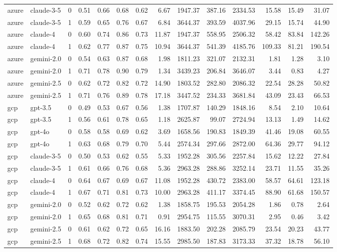 \begin{tabular}{llrrrrrrrrrrrr}
azure & claude-3-5 & 0 & 0.51 & 0.66 & 0.68 & 0.62 & 6.67 & 1947.37 & 387.16 & 2334.53 & 15.58 & 15.49 & 31.07 \\
azure & claude-3-5 & 1 & 0.59 & 0.65 & 0.76 & 0.67 & 6.84 & 3644.37 & 393.59 & 4037.96 & 29.15 & 15.74 & 44.90 \\
azure & claude-4 & 0 & 0.60 & 0.74 & 0.86 & 0.73 & 11.87 & 1947.37 & 558.95 & 2506.32 & 58.42 & 83.84 & 142.26 \\
azure & claude-4 & 1 & 0.62 & 0.77 & 0.87 & 0.75 & 10.94 & 3644.37 & 541.39 & 4185.76 & 109.33 & 81.21 & 190.54 \\
azure & gemini-2.0 & 0 & 0.54 & 0.63 & 0.87 & 0.68 & 1.98 & 1811.23 & 321.07 & 2132.31 & 1.81 & 1.28 & 3.10 \\
azure & gemini-2.0 & 1 & 0.71 & 0.78 & 0.90 & 0.79 & 1.34 & 3439.23 & 206.84 & 3646.07 & 3.44 & 0.83 & 4.27 \\
azure & gemini-2.5 & 0 & 0.62 & 0.72 & 0.82 & 0.72 & 14.90 & 1803.52 & 282.80 & 2086.32 & 22.54 & 28.28 & 50.82 \\
azure & gemini-2.5 & 1 & 0.71 & 0.76 & 0.89 & 0.78 & 17.18 & 3447.52 & 234.33 & 3681.84 & 43.09 & 23.43 & 66.53 \\
gcp & gpt-3.5 & 0 & 0.49 & 0.53 & 0.67 & 0.56 & 1.38 & 1707.87 & 140.29 & 1848.16 & 8.54 & 2.10 & 10.64 \\
gcp & gpt-3.5 & 1 & 0.56 & 0.61 & 0.78 & 0.65 & 1.18 & 2625.87 & 99.07 & 2724.94 & 13.13 & 1.49 & 14.62 \\
gcp & gpt-4o & 0 & 0.58 & 0.58 & 0.69 & 0.62 & 3.69 & 1658.56 & 190.83 & 1849.39 & 41.46 & 19.08 & 60.55 \\
gcp & gpt-4o & 1 & 0.63 & 0.68 & 0.79 & 0.70 & 5.44 & 2574.34 & 297.66 & 2872.00 & 64.36 & 29.77 & 94.12 \\
gcp & claude-3-5 & 0 & 0.50 & 0.53 & 0.62 & 0.55 & 5.33 & 1952.28 & 305.56 & 2257.84 & 15.62 & 12.22 & 27.84 \\
gcp & claude-3-5 & 1 & 0.61 & 0.66 & 0.76 & 0.68 & 5.36 & 2963.28 & 288.86 & 3252.14 & 23.71 & 11.55 & 35.26 \\
gcp & claude-4 & 0 & 0.64 & 0.67 & 0.69 & 0.67 & 11.08 & 1952.28 & 430.72 & 2383.00 & 58.57 & 64.61 & 123.18 \\
gcp & claude-4 & 1 & 0.67 & 0.71 & 0.81 & 0.73 & 10.00 & 2963.28 & 411.17 & 3374.45 & 88.90 & 61.68 & 150.57 \\
gcp & gemini-2.0 & 0 & 0.52 & 0.62 & 0.72 & 0.62 & 1.38 & 1858.75 & 195.53 & 2054.28 & 1.86 & 0.78 & 2.64 \\
gcp & gemini-2.0 & 1 & 0.65 & 0.68 & 0.81 & 0.71 & 0.91 & 2954.75 & 115.55 & 3070.31 & 2.95 & 0.46 & 3.42 \\
gcp & gemini-2.5 & 0 & 0.61 & 0.62 & 0.72 & 0.65 & 16.16 & 1883.50 & 202.28 & 2085.79 & 23.54 & 20.23 & 43.77 \\
gcp & gemini-2.5 & 1 & 0.68 & 0.72 & 0.82 & 0.74 & 15.55 & 2985.50 & 187.83 & 3173.33 & 37.32 & 18.78 & 56.10 \\
\bottomrule
\end{tabular}
